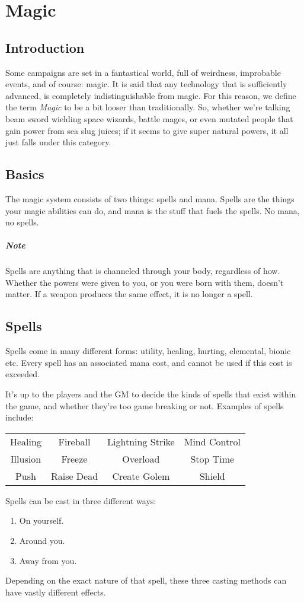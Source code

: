 \chapter{Magic} \label{chap:magic}
\section{Introduction}
Some campaigns are set in a fantastical world, full of weirdness, improbable events, and of course: magic.
It is said that any technology that is sufficiently advanced, is completely indistinguishable from magic.
For this reason, we define the term \textit{Magic} to be a bit looser than traditionally.
So, whether we're talking beam sword wielding space wizards, battle mages, or even mutated people that gain power from sea slug juices;
if it seems to give super natural powers, it all just falls under this category.

\section{Basics}
The magic system consists of two things: spells and mana.
Spells are the things your magic abilities can do, and mana is the stuff that fuels the spells.
No mana, no spells.

\paragraph{Note} Spells are anything that is channeled through your body, regardless of how.
Whether the powers were given to you, or you were born with them, doesn't matter.
If a weapon produces the same effect, it is no longer a spell.

\section{Spells}
Spells come in many different forms: utility, healing, hurting, elemental, bionic etc.
Every spell has an associated mana cost, and cannot be used if this cost is exceeded.

It's up to the players and the GM to decide the kinds of spells that exist within the game, and whether they're too game breaking or not.
Examples of spells include:
\begin{center}
  \begin{tabular}{c|c|c|c}
    Healing & Fireball & Lightning Strike & Mind Control \\
    Illusion & Freeze & Overload & Stop Time \\
    Push & Raise Dead & Create Golem & Shield
  \end{tabular}
\end{center}
Spells can be cast in three different ways:
\begin{enumerate}
\item On yourself.
\item Around you.
\item Away from you.
\end{enumerate}
Depending on the exact nature of that spell, these three casting methods can have vastly different effects.

